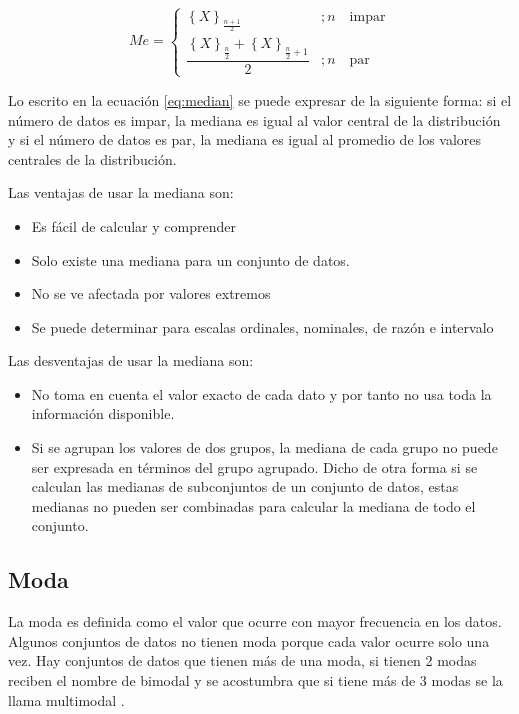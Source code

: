 \documentclass[letterpaper,]{book}
\providecommand{\tightlist}{%
  \setlength{\itemsep}{0pt}\setlength{\parskip}{0pt}}
\begin{document}
\begin{equation}
Me = \begin{cases} 
      \left \{ X \right\}_{\frac{n+1}{2}} & ; n \quad \textrm{impar}  \\
      \dfrac{\left \{ X  \right \}_{\frac{n}{2}} + \left \{ X  \right \}_{\frac{n}{2}+1} }{2} & ; n \quad \textrm{par}
   \end{cases}
   \label{eq:median}
\end{equation}

Lo escrito en la ecuación \eqref{eq:median} se puede expresar de la siguiente forma: si el número de datos es impar, la mediana es igual al valor central de la distribución y si el número de datos es par, la mediana es igual al promedio de los valores centrales de la distribución.

Las ventajas de usar la mediana son:

\begin{itemize}
\tightlist
\item
  Es fácil de calcular y comprender
\item
  Solo existe una mediana para un conjunto de datos.
\item
  No se ve afectada por valores extremos
\item
  Se puede determinar para escalas ordinales, nominales, de razón e intervalo
\end{itemize}

Las desventajas de usar la mediana son:

\begin{itemize}
\tightlist
\item
  No toma en cuenta el valor exacto de cada dato y por tanto no usa toda la información disponible.
\item
  Si se agrupan los valores de dos grupos, la mediana de cada grupo no puede ser expresada en términos del grupo agrupado. Dicho de otra forma si se calculan las medianas de subconjuntos de un conjunto de datos, estas medianas no pueden ser combinadas para calcular la mediana de todo el conjunto. \citep{zurita2010}
\end{itemize}

\hypertarget{moda}{%
\subsection{Moda}\label{moda}}

La moda es definida como el valor que ocurre con mayor frecuencia en los datos. Algunos conjuntos de datos no tienen moda porque cada valor ocurre solo una vez. Hay conjuntos de datos que tienen más de una moda, si tienen 2 modas reciben el nombre de bimodal y se acostumbra que si tiene más de 3 modas se la llama multimodal \citep{siegel2016}.
\end{document}
